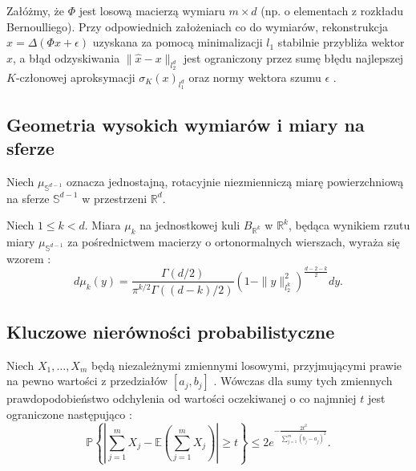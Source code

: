 \begin{tw}
Załóżmy, że $\Phi$ jest losową macierzą wymiaru $m \times d$ (np. o elementach z rozkładu Bernoulliego). Przy odpowiednich założeniach co do wymiarów, rekonstrukcja $\hat{x} = \Delta(\Phi x + \epsilon)$ uzyskana za pomocą minimalizacji $l_1$ stabilnie przybliża wektor $x$, a błąd odzyskiwania $\|\hat{x} - x\|_{l_2^d}$ jest ograniczony przez sumę błędu najlepszej $K$-członowej aproksymacji $\sigma_K(x)_{l_1^d}$ oraz normy wektora szumu $\epsilon$ .
\end{tw}

\subsection{Geometria wysokich wymiarów i miary na sferze}

\begin{df}
Niech $\mu_{\mathbb{S}^{d-1}}$ oznacza jednostajną, rotacyjnie niezmienniczą miarę powierzchniową na sferze $\mathbb{S}^{d-1}$ w przestrzeni $\mathbb{R}^d$.
\end{df}

\begin{tw}
Niech $1 \le k < d$. Miara $\mu_k$ na jednostkowej kuli $B_{\mathbb{R}^k}$ w $\mathbb{R}^k$, będąca wynikiem rzutu miary $\mu_{\mathbb{S}^{d-1}}$ za pośrednictwem macierzy o ortonormalnych wierszach, wyraża się wzorem : 
$$d\mu_k(y) = \frac{\Gamma(d/2)}{\pi^{k/2}\Gamma((d-k)/2)}(1 - \|y\|_{l_2^k}^2)^{\frac{d-2-k}{2}}dy.$$
\end{tw}

\subsection{Kluczowe nierówności probabilistyczne}

\begin{tw}
Niech $X_1, \dots, X_m$ będą niezależnymi zmiennymi losowymi, przyjmującymi prawie na pewno wartości z przedziałów $[a_j, b_j]$ . Wówczas dla sumy tych zmiennych prawdopodobieństwo odchylenia od wartości oczekiwanej o co najmniej $t$ jest ograniczone następująco : 
$$\mathbb{P}\left\{ \left| \sum_{j=1}^m X_j - \mathbb{E}\left(\sum_{j=1}^m X_j\right) \right| \ge t \right\} \le 2e^{-\frac{2t^2}{\sum_{j=1}^m (b_j - a_j)^2}}.$$
\end{tw}

